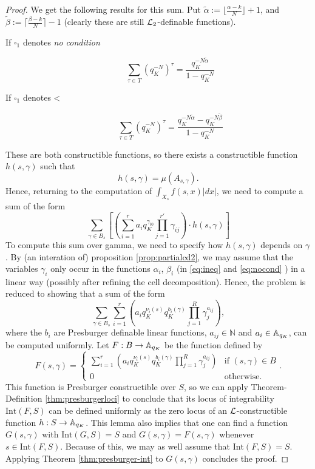 \begin{proof}
We get the following results for this sum. 
Put $\tilde{\alpha}:= \lfloor\frac{\alpha -k}{N}\rfloor+1$, and $\tilde{\beta}:= \lceil\frac{\beta -k}{N}\rceil-1$ (clearly these are still $\Lm_2$-definable functions). 

\begin{description}
\item[If $\square_{1}$ denotes \emph{no condition}]
\begin{equation}\label{eq:nocond}\sum_{\tau \in T} (q_K^{-N})^\tau = \frac{q_K^{-N\tilde{\alpha}}}{1-q_K^{-N}} \end{equation}
\item[If $\square_{1}$ denotes <]
\begin{equation}\label{eq:ineq}\sum_{\tau \in T} (q_K^{-N})^\tau = \frac{q_K^{-N\tilde{\alpha}}-q_K^{-N\tilde{\beta}}}{1-q_K^{-N}} \end{equation}
\end{description}
These are both constructible functions, so there exists a constructible function $h(s,\gamma)$ such that \[h(s,\gamma) = \mu(A_{s, \gamma}).\]
Hence, returning to the computation of $\int_{X_s} f(s,x)|dx|$, we need to compute a sum of the form
\[\sum_{\gamma \in B_s}\left[ \left(\sum_{i=1}^r a_i q_K^{\gamma_{i0}} \prod_{j=1}^{r'}\gamma_{ij}\right) \cdot h(s,\gamma)\right]\]
To compute this sum over gamma, we need to specify how $h(s,\gamma)$ depends on $\gamma$. 
By (an interation of) proposition \ref{prop:partialcd2}, we may assume that the variables $\gamma_i$ only occur in the functions $\alpha_i$, $\beta_i$ (in \eqref{eq:ineq} and \eqref{eq:nocond} ) in a { linear} way (possibly after refining the cell decomposition). Hence, the problem is reduced to showing that a sum of the form 
\[\sum_{\gamma \in B_s} \sum_{i=1}^r \left(a_i q_K^{\nu_i(s)}q_K^{b_i(\gamma)} \prod_{j=1}^{R}\gamma_{j}^{a_{ij}}\right),\]
where the $b_i$ are Presburger definable linear functions, %
$a_{ij} \in \mathbb{N}$ and $a_i \in \AA_{q_K}$, can be computed uniformly.
Let $F: B\to \AA_{q_K}$ be the function defined by
\[F(s,\gamma) = \left\{\begin{array}{ll}{\sum_{i=1}^r \left(a_i q_K^{\nu_i(s)}q_K^{b_i(\gamma)} \prod_{j=1}^{R}\gamma_{j}^{a_{ij}}\right)} & \text{if } (s,\gamma)\in B\\ 0 & \text{otherwise}.
\end{array}.\right.\]
This function is Presburger constructible over $S$, so we can apply
Theorem-Definition \ref{thm:presburgerloci} to conclude that its locus of integrability $\text{Int}(F,S)$ can be defined uniformly as the zero locus of an $\Lm$-constructible function $h: S\to \AA_{q_K}$. 
This lemma also implies that one can find a function $G(s,\gamma)$ with $\text{Int}(G,S)= S$ and $G(s,\gamma) = F(s,\gamma)$ whenever $s \in \text{Int}(F,S)$. Because of this, we may as well assume that $\text{Int}(F,S)=S$. Applying Theorem \ref{thm:presburger-int} to $G(s,\gamma)$ concludes the proof.
\end{proof}

